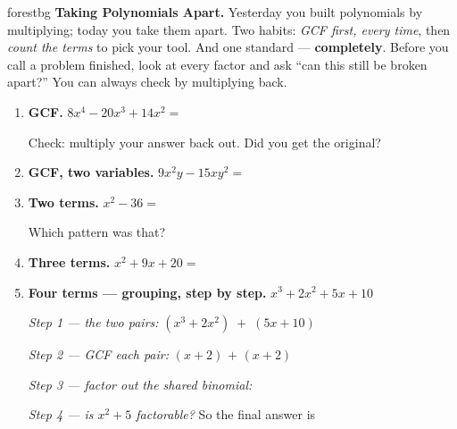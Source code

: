 \documentclass[10pt]{article}
\begin{document}
\namepartnerperiod

\vspace{0.08in}

\begin{headlinebox}{forestbg}
\small\textbf{Taking Polynomials Apart.} Yesterday you built polynomials by multiplying; today you
take them apart. Two habits: \emph{GCF first, every time}, then \emph{count the terms} to pick your
tool. And one standard --- \textbf{completely}. Before you call a problem finished, look at every
factor and ask ``can this still be broken apart?'' You can always check by multiplying back.
\end{headlinebox}

\vspace{0.06in}

\begin{tcolorbox}[colback=white, colframe=black!40, title=\textbf{Tier R --- Remediate},
    fonttitle=\bfseries, arc=1.5mm, left=3mm, right=3mm, top=2mm, bottom=2mm, breakable]
\begin{enumerate}[leftmargin=1.7em, itemsep=9pt]
  \item \textbf{GCF.} $8x^4 - 20x^3 + 14x^2 = $ 

    \vspace{2pt}
    Check: multiply your answer back out. Did you get the original? 

  \item \textbf{GCF, two variables.} $9x^2y - 15xy^2 = $ 

  \item \textbf{Two terms.} $x^2 - 36 = $ 

    \vspace{2pt}
    Which pattern was that? 

  \item \textbf{Three terms.} $x^2 + 9x + 20 = $ 

  \item \textbf{Four terms --- grouping, step by step.} $x^3 + 2x^2 + 5x + 10$

    \vspace{3pt}
    \emph{Step 1 --- the two pairs:} \; $(x^3 + 2x^2) \; + \; (5x + 10)$

    \vspace{3pt}
    \emph{Step 2 --- GCF each pair:} \; $(x+2)$ \; $+$ \; $(x+2)$

    \vspace{3pt}
    \emph{Step 3 --- factor out the shared binomial:} 

    \vspace{3pt}
    \emph{Step 4 --- is $x^2+5$ factorable?}  \; So the final answer is
\end{enumerate}
\end{tcolorbox}
\end{document}
